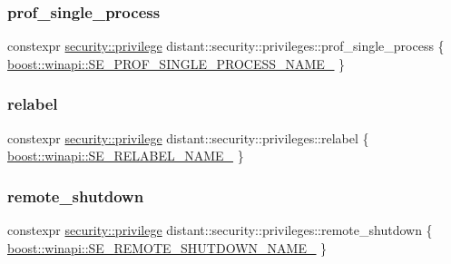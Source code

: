\mbox{\label{namespacedistant_1_1security_1_1privileges_a79cd2de4bed7dc24558f0e4180af9a9d}} 
\subsubsection{\texorpdfstring{prof\+\_\+single\+\_\+process}{prof\_single\_process}}
{\footnotesize\ttfamily constexpr \mbox{\hyperlink{classdistant_1_1security_1_1privilege}{security\+::privilege}} distant\+::security\+::privileges\+::prof\+\_\+single\+\_\+process \{ \mbox{\hyperlink{namespaceboost_1_1winapi_ad2afe2d90887ceb14d6f0317cadd0be0}{boost\+::winapi\+::\+S\+E\+\_\+\+P\+R\+O\+F\+\_\+\+S\+I\+N\+G\+L\+E\+\_\+\+P\+R\+O\+C\+E\+S\+S\+\_\+\+N\+A\+M\+E\+\_\+}} \}}

\mbox{\label{namespacedistant_1_1security_1_1privileges_ac582f9f81e347f6032910440996e3051}} 
\subsubsection{\texorpdfstring{relabel}{relabel}}
{\footnotesize\ttfamily constexpr \mbox{\hyperlink{classdistant_1_1security_1_1privilege}{security\+::privilege}} distant\+::security\+::privileges\+::relabel \{ \mbox{\hyperlink{namespaceboost_1_1winapi_ac0b494d146c544a2a50663fc0347e25a}{boost\+::winapi\+::\+S\+E\+\_\+\+R\+E\+L\+A\+B\+E\+L\+\_\+\+N\+A\+M\+E\+\_\+}} \}}

\mbox{\label{namespacedistant_1_1security_1_1privileges_a1a42bee787a5f65817e85d4b69f9b22a}} 
\subsubsection{\texorpdfstring{remote\+\_\+shutdown}{remote\_shutdown}}
{\footnotesize\ttfamily constexpr \mbox{\hyperlink{classdistant_1_1security_1_1privilege}{security\+::privilege}} distant\+::security\+::privileges\+::remote\+\_\+shutdown \{ \mbox{\hyperlink{namespaceboost_1_1winapi_a767b78150dc6e2fbfe5d78dc9f1c46cd}{boost\+::winapi\+::\+S\+E\+\_\+\+R\+E\+M\+O\+T\+E\+\_\+\+S\+H\+U\+T\+D\+O\+W\+N\+\_\+\+N\+A\+M\+E\+\_\+}} \}}

